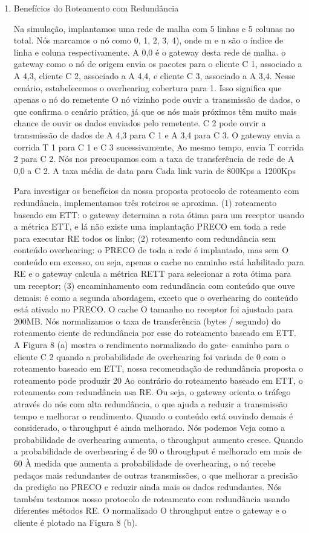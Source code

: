 \documentclass[12pt]{article}
\begin{document}
\begin{enumerate}
\begin{enumerate}
		\item Benefícios do Roteamento com Redundância
		
		Na simulação, implantamos uma rede de malha com 5 linhas
		e 5 colunas no total. Nós marcamos o nó como 0, 1, 2, 3, 4), onde m e n são o índice de linha e coluna
	respectivamente. A 0,0 é o gateway desta rede de malha. o
gateway como o nó de origem envia os pacotes para o cliente C 1,
associado a A 4,3, cliente C 2, associado a A 4,4, e
cliente C 3, associado a A 3,4. Nesse cenário, estabelecemos o
overhearing cobertura para 1. Isso significa que apenas o nó do remetente
O nó vizinho pode ouvir a transmissão de dados, o que
confirma o cenário prático, já que os nós mais próximos têm
muito mais chance de ouvir os dados enviados pelo remetente. C 2
pode ouvir a transmissão de dados de A 4,3 para C 1 e A 3,4 para
C 3. O gateway envia a corrida T 1 para C 1 e C 3 sucessivamente,
Ao mesmo tempo, envia T corrida 2 para C 2. Nós nos preocupamos com a
taxa de transferência de rede de A 0,0 a C 2. A taxa média de data para
Cada link varia de 800Kps a 1200Kps

Para investigar os benefícios da nossa proposta
protocolo de roteamento com redundância, implementamos três roteiros
se aproxima. (1) roteamento baseado em ETT: o gateway determina
a rota ótima para um receptor usando a métrica ETT, e lá
não existe uma implantação PRECO em toda a rede para executar RE
todos os links; (2) roteamento com redundância sem conteúdo
overhearing: o PRECO de toda a rede é implantado, mas sem
O conteúdo em excesso, ou seja, apenas o cache no caminho está habilitado para
RE e o gateway calcula a métrica RETT para selecionar
a rota ótima para um receptor; (3) encaminhamento com redundância
com conteúdo que ouve demais: é como a segunda abordagem, exceto
que o overhearing do conteúdo está ativado no PRECO. O cache
O tamanho no receptor foi ajustado para 200MB. Nós normalizamos o
taxa de transferência (bytes / segundo) do roteamento ciente de redundância por esse
do roteamento baseado em ETT.
A Figura 8 (a) mostra o rendimento normalizado do gate-
caminho para o cliente C 2 quando a probabilidade de overhearing foi variada
de 0%
com o roteamento baseado em ETT, nossa recomendação de redundância proposta
o roteamento pode produzir 20%
Ao contrário do roteamento baseado em ETT, o roteamento com redundância
usa RE. Ou seja, o gateway orienta o tráfego através do
nós com alta redundância, o que ajuda a reduzir a transmissão
tempo e melhorar o rendimento. Quando o conteúdo está ouvindo demais
é considerado, o throughput é ainda melhorado. Nós podemos
Veja como a probabilidade de overhearing aumenta, o throughput
aumento cresce. Quando a probabilidade de overhearing é de 90%
o throughput é melhorado em mais de 60%
À medida que aumenta a probabilidade de overhearing, o nó recebe
pedaços mais redundantes de outras transmissões, o que
melhorar a precisão da predição no PRECO e reduzir ainda mais
os dados redundantes. Nós também testamos nosso protocolo de roteamento com redundância usando diferentes métodos RE. O normalizado
O throughput entre o gateway e o cliente é plotado
na Figura 8 (b).


\end{enumerate}
\end{enumerate}
\end{document}
